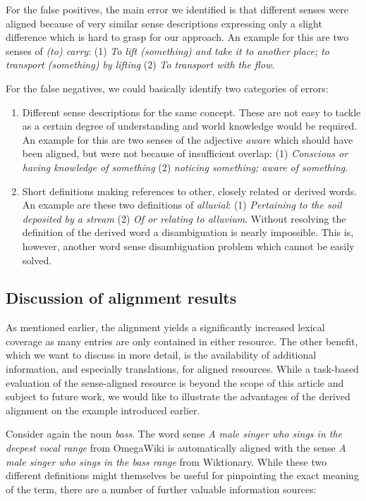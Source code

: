 \documentclass[output=paper]{LSP/langsci}
\begin{document}
For the false positives, the main error we identified is that different senses were aligned because of very similar sense descriptions expressing only a slight difference which is hard to grasp for our approach. An example for this are two senses of \textit{(to) carry}: (1) \textit{To lift (something) and take it to another place; to transport (something) by lifting} (2)  \textit{To transport with the flow}. 

For the false negatives, we could basically identify two categories of errors:

\begin{enumerate}
\item Different sense descriptions for the same concept. These are not easy to tackle as a certain degree of understanding and world knowledge would be required. An example for this are two senses of the adjective \textit{aware} which should have been aligned, but were not because of insufficient overlap: (1) \textit{Conscious or having knowledge of something} (2) \textit{noticing something; aware of something}.

\item Short definitions making references to other, closely related or derived words. An example are these two definitions of \textit{alluvial}: (1) \textit{Pertaining to the soil deposited by a stream} (2) \textit{Of or relating to alluvium}. Without resolving the definition of the derived word a disambiguation is nearly impossible. This is, however, another word sense disambiguation problem which cannot be easily solved. 
\end{enumerate}


\subsection{Discussion of alignment results}

As mentioned earlier, the alignment yields a significantly increased lexical coverage as many entries are only contained in either resource. The other benefit, which we want to discuss in more detail, is the availability of additional information, and especially translations, for aligned resources. While a task-based evaluation of the sense-aligned resource is beyond the scope of this article and subject to future work, we would like to illustrate the advantages of the derived alignment on the example introduced earlier. 

Consider again the noun \textit{bass}. The word sense \textit{A male singer who sings in the deepest vocal range} from Omega\-Wiki is automatically aligned with the sense \textit{A male singer who sings in the bass range} from Wiktionary. While these two different definitions might themselves be useful for pinpointing the exact meaning of the term, there are a number of further valuable information sources:
\end{document}
